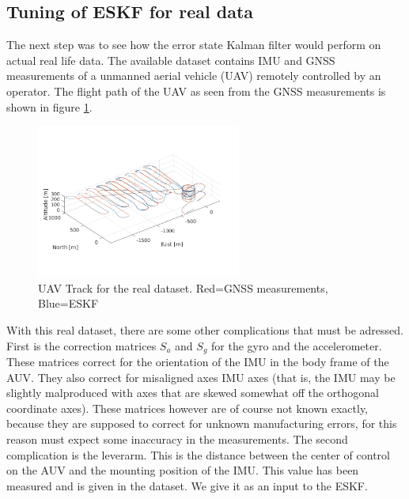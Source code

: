 \subsection{Tuning of ESKF for real data} \label{a2task3}
The next step was to see how the error state Kalman filter would perform on actual real life data. The available dataset contains IMU and GNSS measurements of a unmanned aerial vehicle (UAV) remotely controlled by an operator. The flight path of the UAV as seen from the GNSS measurements is shown in figure \ref{fig:real-track}.
\begin{figure}[H]
\centering
\includegraphics[width=0.6\textwidth]{plots/a2-real-track}
\caption{UAV Track for the real dataset. Red=GNSS measurements, Blue=ESKF}
\label{fig:real-track}
\end{figure}
With this real dataset, there are some other complications that must be adressed. First is the correction matrices $S_a$ and $S_g$ for the gyro and the accelerometer. These matrices correct for the orientation of the IMU in the body frame of the AUV. They also correct for misaligned axes IMU axes (that is, the IMU may be slightly malproduced with axes that are skewed somewhat off the orthogonal coordinate axes). These matrices however are of course not known exactly, because they are supposed to correct for unknown manufacturing errors, for this reason must expect some inaccuracy in the measurements. The second complication is the leverarm. This is the distance between the center of control on the AUV and the mounting position of the IMU. This value has been measured and is given in the dataset. We give it as an input to the ESKF.

